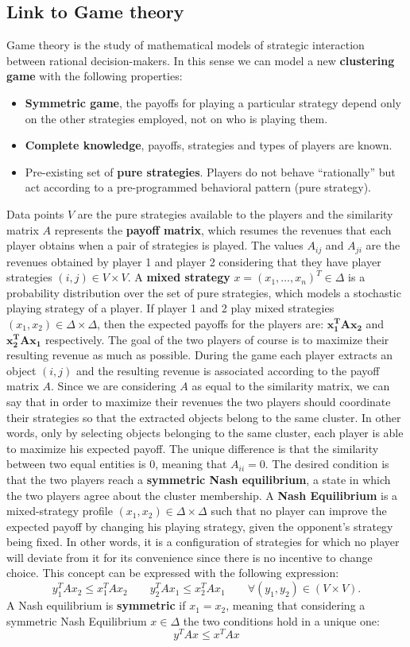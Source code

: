 \subsection{Link to Game theory}
Game theory is the study of mathematical models of strategic interaction between rational decision-makers. In this sense we can model a new \textbf{clustering game} with the following properties:
\begin{itemize}
	\item \textbf{Symmetric game}, the payoffs for playing a particular strategy depend only on the other strategies employed, not on who is playing them. 
	\item \textbf{Complete knowledge}, payoffs, strategies and types of players are known.
	\item Pre-existing set of \textbf{pure strategies}. Players do not behave “rationally” but act according to a pre-programmed behavioral pattern (pure strategy).
\end{itemize}
Data points $V$ are the pure strategies available to the players and the similarity matrix $A$ represents the \textbf{payoff matrix}, which resumes the revenues that each player obtains when a pair of strategies is played. The values $A_{ij}$ and $A_{ji}$ are the revenues obtained by player 1 and player 2 considering that they have player strategies $(i,j) \in V\times V$.
A \textbf{mixed strategy} $x=(x_1, \dots, x_n)^T \in \Delta$ is a probability distribution over the set of pure strategies, which models a stochastic playing strategy of a player. If player 1 and 2 play mixed strategies $(x_1, x_2) \in \Delta \times \Delta$, then the expected payoffs for the players are: $\mathbf{x_1^TAx_2}$ and $\mathbf{x_2^TAx_1}$ respectively.
The goal of the two players of course is to maximize their resulting revenue as much as possible. During the game each player extracts an object $(i,j)$ and the resulting revenue is associated
according to the payoff matrix $A$. Since we are considering $A$ as equal to the similarity matrix, we can say that in order to maximize their revenues the two players should coordinate their strategies so that the extracted objects belong to the same cluster. In other words, only by selecting objects belonging to the same cluster, each player is able to maximize his expected payoff. The unique difference is that the similarity between two equal entities is $0$, meaning that $A_{ii} = 0$. The desired condition is that the two players reach a \textbf{symmetric Nash equilibrium}, a state in which the two players agree about the cluster membership. A \textbf{Nash Equilibrium} is a mixed-strategy profile $(x_1,x_2)\in \Delta\times \Delta$ such that no player can improve the expected payoff by changing his playing strategy, given the opponent's strategy being fixed. In other words, it is a configuration of strategies for which no player will deviate from it for its convenience since there is no incentive to change choice. This concept can be expressed with the following expression:
$$y_1^TAx_2 \leq x_1^TAx_2 \qquad y_2^TAx_1 \leq x_2^TAx_1 \qquad \forall (y_1,y_2) \in (V\times V).$$ 
A Nash equilibrium is \textbf{symmetric} if $x_1 = x_2$, meaning that considering a symmetric Nash Equilibrium $x \in \Delta$ the two conditions hold in a unique one:
$$y^TAx \leq x^TAx$$

